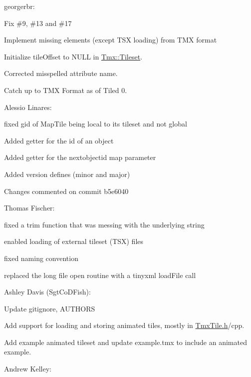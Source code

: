 \begin{DoxyItemize}
\item georgerbr\-:
\begin{DoxyItemize}
\item Fix \#9, \#13 and \#17
\item Implement missing elements (except T\-S\-X loading) from T\-M\-X format
\item Initialize tile\-Offset to N\-U\-L\-L in \hyperlink{classTmx_1_1Tileset}{Tmx\-::\-Tileset}.
\item Corrected misspelled attribute name.
\item Catch up to T\-M\-X Format as of Tiled 0.
\end{DoxyItemize}
\item Alessio Linares\-:
\begin{DoxyItemize}
\item fixed gid of Map\-Tile being local to its tileset and not global
\item Added getter for the id of an object
\item Added getter for the nextobjectid map parameter
\item Added version defines (minor and major)
\item Changes commented on commit b5e6040
\end{DoxyItemize}
\item Thomas Fischer\-:
\begin{DoxyItemize}
\item fixed a trim function that was messing with the underlying string
\item enabled loading of external tileset (T\-S\-X) files
\item fixed naming convention
\item replaced the long file open routine with a tinyxml load\-File call
\end{DoxyItemize}
\item Ashley Davis (Sgt\-Co\-D\-Fish)\-:
\begin{DoxyItemize}
\item Update gitignore, A\-U\-T\-H\-O\-R\-S
\item Add support for loading and storing animated tiles, mostly in \hyperlink{TmxTile_8h_source}{Tmx\-Tile.\-h}/cpp.
\item Add example animated tileset and update example.\-tmx to include an animated example.
\end{DoxyItemize}
\item Andrew Kelley\-:
\begin{DoxyItemize}

\end{DoxyItemize}
\end{DoxyItemize}
